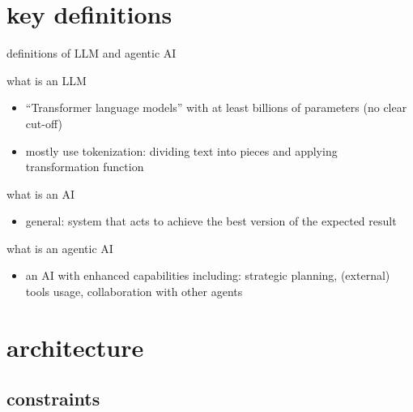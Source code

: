 \documentclass[t,
10pt,
]{beamer}
\numberwithin{equation}{section}
\begin{document}
	\section{key definitions}
	
	\begin{frame}[c]{definitions of LLM and agentic AI}
		\begin{block}{what is an LLM}
			\begin{itemize}
				\item \enquote{Transformer language models} \autocite{zhao2026surveylargelanguagemodels} with at least billions of parameters (no clear cut-off) \autocite{zhao2026surveylargelanguagemodels}
				\item mostly use tokenization: dividing text into pieces and applying transformation function
			\end{itemize}
		\end{block}
		\pause
		\begin{block}{what is an AI}
			\begin{itemize}
				\item general: system that acts to achieve the best version of the expected result \autocite{russell2023}
			\end{itemize}
		\end{block}
		\pause
		\begin{block}{what is an agentic AI}
			\begin{itemize}
				\item an AI with enhanced capabilities including: strategic planning, (external) tools usage, collaboration with other agents \autocite{agenticAiDefinitions}
			\end{itemize}
		\end{block}
	\end{frame}	
	
	\section{architecture}
	\subsection{constraints}
	
\end{document}
